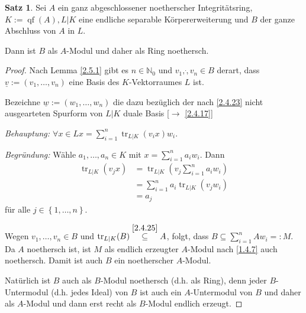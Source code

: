 \documentclass[
twoside=semi,
fontsize=12,
DIV=12, 
cleardoublepage=current,
leqno,
headings=optiontoheadandtoc, 
toc=idx
]{scrbook}
\newcommand{\N}{\mathbb{N}}
\newcommand{\brac}[1]{\left( #1 \right)}
\newcommand{\set}[1]{\left\{ #1 \right\}}
\DeclareMathOperator{\qf}{qf}
\DeclareMathOperator{\tr}{tr}
\theoremstyle{definition}
\newtheorem{satz}[definition]{Satz}
\begin{document}
 	\begin{satz}\label{2.5.2}
 		Sei $A$ ein ganz abgeschlossener noetherscher Integrit\"atsring, $K:= \qf(A), L|K$ eine endliche separable K\"orpererweiterung und $B$ der ganze Abschluss von $A$ in $L$.
 		
 		Dann ist $B$ als $A$-Modul und daher als Ring noethersch.
 		
 		\begin{proof}
 			Nach Lemma \ref{2.5.1} gibt es $n \in \N_0$ und $v_1, \dot, v_n \in B$ derart, dass $\underline{v} := (v_1, \dots, v_n)$ eine Basis des $K$-Vektorraumes $L$ ist.
 			
 			Bezeichne $\underline{w} := (w_1, \dots, w_n)$ die dazu bez\"uglich der nach \ref{2.4.23} nicht ausgearteten Spurform von $L|K$ duale Basis [$\to$ \ref{2.4.17}]
 			
 			\emph{Behauptung: $\forall x \in Lx = \sum_{i=1}^{n} \tr_{L|K}(v_ix)w_i$}.
 			
 			\emph{Begr\"undung: } W\"ahle $a_1, \dots, a_n \in K$ mit $x = \sum_{i=1}^{n} a_iw_i$. Dann 
 			\begin{align*}
 				\tr_{L|K}(v_jx) &= \tr_{L|K}\brac{v_j\sum_{i=1}^{n}a_iw_i}\\
 				&= \sum_{i=1}^{n} a_i\tr_{L|K}(v_jw_i)\\
 				&= a_j
 			\end{align*}
 			f\"ur alle $j \in \set{1,\dots, n}$.
 			
 			Wegen $v_1, \dots, v_n \in B$ und $\tr_{L|K}(B) \overset{\ref{2.4.25}}{\subseteq} A$, folgt, dass $B \subseteq \sum_{i=1}^{n} Aw_i =: M$. Da $A$ noethersch ist,
 			ist $M$ als endlich erzeugter $A$-Modul nach \ref{1.4.7} auch noethersch. Damit ist auch $B$ ein noetherscher $A$-Modul.
 			
 			Nat\"urlich ist $B$ auch als $B$-Modul noethersch (d.h. als Ring), denn jeder $B$-Untermodul (d.h. jedes Ideal) von $B$ ist auch ein $A$-Untermodul von $B$ und daher als $A$-Modul 
 			und dann erst recht als $B$-Modul endlich erzeugt.
 		\end{proof}
 	\end{satz}
 
\end{document}
